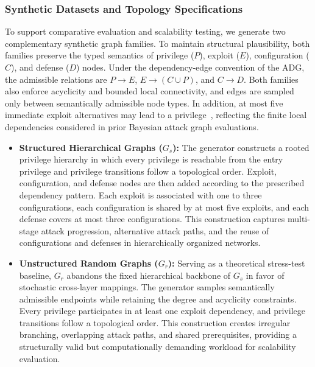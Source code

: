 \documentclass[conference]{IEEEtran}
\theoremstyle{definition} %
\theoremstyle{plain} %
\begin{document}
{\color{red}
\subsubsection{Synthetic Datasets and Topology Specifications}

To support comparative evaluation and scalability testing, we generate two complementary synthetic graph families. To maintain structural plausibility, both families preserve the typed semantics of privilege ($P$), exploit ($E$), configuration ($C$), and defense ($D$) nodes. Under the dependency-edge convention of the ADG, the admissible relations are $P\rightarrow E$, $E\rightarrow(C\cup P)$, and $C\rightarrow D$. Both families also enforce acyclicity and bounded local connectivity, and edges are sampled only between semantically admissible node types. In addition, at most five immediate exploit alternatives may lead to a privilege~\cite{munoz2017exact}, reflecting the finite local dependencies considered in prior Bayesian attack graph evaluations.

\begin{itemize}
    \item \textbf{Structured Hierarchical Graphs ($G_s$):}
    The generator constructs a rooted privilege hierarchy in which every privilege is reachable from the entry privilege and privilege transitions follow a topological order. Exploit, configuration, and defense nodes are then added according to the prescribed dependency pattern. Each exploit is associated with one to three configurations, each configuration is shared by at most five exploits, and each defense covers at most three configurations. This construction captures multi-stage attack progression, alternative attack paths, and the reuse of configurations and defenses in hierarchically organized networks.

    \item \textbf{Unstructured Random Graphs ($G_r$):}
    Serving as a theoretical stress-test baseline, $G_r$ abandons the fixed hierarchical backbone of $G_s$ in favor of stochastic cross-layer mappings. The generator samples semantically admissible endpoints while retaining the degree and acyclicity constraints. Every privilege participates in at least one exploit dependency, and privilege transitions follow a topological order. This construction creates irregular branching, overlapping attack paths, and shared prerequisites, providing a structurally valid but computationally demanding workload for scalability evaluation.
\end{itemize}

}
\end{document}
